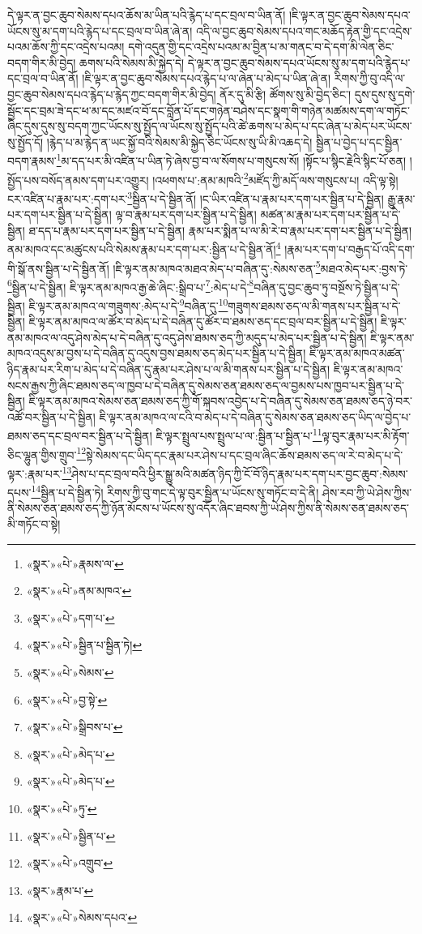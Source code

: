 དེ་ལྟར་ན་བྱང་ཆུབ་སེམས་དཔའ་ཆོས་མ་ཡིན་པའི་རྙེད་པ་དང་བྲལ་བ་ཡིན་ནོ། །ཇི་ལྟར་ན་བྱང་ཆུབ་སེམས་དཔའ་ཡོངས་སུ་མ་དག་པའི་རྙེད་པ་དང་བྲལ་བ་ཡིན་ཞེ་ན། འདི་ལ་བྱང་ཆུབ་སེམས་དཔའ་གང་མཆོད་རྟེན་གྱི་དང་འདྲེས་པའམ་ཆོས་ཀྱི་དང་འདྲེས་པའམ། དགེ་འདུན་གྱི་དང་འདྲེས་པའམ་མ་བྱིན་པ་མ་གནང་བ་དེ་དག་མི་ལེན་ཅིང་བདག་གིར་མི་བྱེད། ཆགས་པའི་སེམས་མི་སྐྱེད་དེ། དེ་ལྟར་ན་བྱང་ཆུབ་སེམས་དཔའ་ཡོངས་སུ་མ་དག་པའི་རྙེད་པ་དང་བྲལ་བ་ཡིན་ནོ། །ཇི་ལྟར་ན་བྱང་ཆུབ་སེམས་དཔའ་རྙེད་པ་ལ་ཞེན་པ་མེད་པ་ཡིན་ཞེ་ན། རིགས་ཀྱི་བུ་འདི་ལ་བྱང་ཆུབ་སེམས་དཔའ་རྙེད་པ་རྙེད་ཀྱང་བདག་གིར་མི་བྱེད། ནོར་དུ་མི་རྩི། ཚོགས་སུ་མི་བྱེད་ཅིང་། དུས་དུས་སུ་དགེ་སྦྱོང་དང་བྲམ་ཟེ་དང་ཕ་མ་དང་མཛའ་བོ་དང་བློན་པོ་དང་གཉེན་བཤེས་དང་སྣག་གི་གཉེན་མཚམས་དག་ལ་གཏོང་ཞིང་དུས་དུས་སུ་བདག་ཀྱང་ཡོངས་སུ་སྤྱོད་ལ་ཡོངས་སུ་སྤྱོད་པའི་ཚེ་ཆགས་པ་མེད་པ་དང་ཞེན་པ་མེད་པར་ཡོངས་སུ་སྤྱོད་དོ། །རྙེད་པ་མ་རྙེད་ན་ཡང་སྐྱོ་བའི་སེམས་མི་སྐྱེད་ཅིང་ཡོངས་སུ་ཡི་མི་འཆད་དེ། སྦྱིན་པ་བྱེད་པ་དང་སྦྱིན་བདག་རྣམས་\footnote{«སྣར་»«པེ་»རྣམས་ལ་}མ་དད་པར་མི་འཛིན་པ་ཡིན་ཏེ་ཞེས་བྱ་བ་ལ་སོགས་པ་གསུངས་སོ། །སྟོང་པ་སྙིང་རྗེའི་སྙིང་པོ་ཅན། །སྤྱོད་པས་བསོད་ནམས་དག་པར་འགྱུར། །འཕགས་པ་:ནམ་མཁའི་\footnote{«སྣར་»«པེ་»ནམ་མཁའ་}མཛོད་ཀྱི་མདོ་ལས་གསུངས་པ། འདི་ལྟ་སྟེ། ངར་འཛིན་པ་རྣམ་པར་:དག་པར་\footnote{«སྣར་»«པེ་»དག་པ་}སྦྱིན་པ་དེ་སྦྱིན་ནོ། །ང་ཡིར་འཛིན་པ་རྣམ་པར་དག་པར་སྦྱིན་པ་དེ་སྦྱིན། རྒྱུ་རྣམ་པར་དག་པར་སྦྱིན་པ་དེ་སྦྱིན། ལྟ་བ་རྣམ་པར་དག་པར་སྦྱིན་པ་དེ་སྦྱིན། མཚན་མ་རྣམ་པར་དག་པར་སྦྱིན་པ་དེ་སྦྱིན། ཐ་དད་པ་རྣམ་པར་དག་པར་སྦྱིན་པ་དེ་སྦྱིན། རྣམ་པར་སྨིན་པ་ལ་མི་རེ་བ་རྣམ་པར་དག་པར་སྦྱིན་པ་དེ་སྦྱིན། ནམ་མཁའ་དང་མཚུངས་པའི་སེམས་རྣམ་པར་དག་པར་:སྦྱིན་པ་དེ་སྦྱིན་ནོ།\footnote{«སྣར་»«པེ་»སྦྱིན་པ་སྦྱིན་ཏེ།} །རྣམ་པར་དག་པ་བརྒྱད་པོ་འདི་དག་གི་སྒོ་ནས་སྦྱིན་པ་དེ་སྦྱིན་ནོ། །ཇི་ལྟར་ནམ་མཁའ་མཐའ་མེད་པ་བཞིན་དུ་:སེམས་ཅན་\footnote{«སྣར་»«པེ་»སེམས་}མཐའ་མེད་པར་:བྱས་ཏེ་\footnote{«སྣར་»«པེ་»བྱ་སྟེ་}སྦྱིན་པ་དེ་སྦྱིན། ཇི་ལྟར་ནམ་མཁའ་རྒྱ་ཆེ་ཞིང་:སྒྲིབ་པ་\footnote{«སྣར་»«པེ་»སྒྲིབས་པ་}:མེད་པ་དེ་\footnote{«སྣར་»«པེ་»མེད་པ་}བཞིན་དུ་བྱང་ཆུབ་ཏུ་བསྔོས་ཏེ་སྦྱིན་པ་དེ་སྦྱིན། ཇི་ལྟར་ནམ་མཁའ་ལ་གཟུགས་:མེད་པ་དེ་\footnote{«སྣར་»«པེ་»མེད་པ་}བཞིན་དུ་\footnote{«སྣར་»«པེ་»ཏུ་}གཟུགས་ཐམས་ཅད་ལ་མི་གནས་པར་སྦྱིན་པ་དེ་སྦྱིན། ཇི་ལྟར་ནམ་མཁའ་ལ་ཚོར་བ་མེད་པ་དེ་བཞིན་དུ་ཚོར་བ་ཐམས་ཅད་དང་བྲལ་བར་སྦྱིན་པ་དེ་སྦྱིན། ཇི་ལྟར་ནམ་མཁའ་ལ་འདུ་ཤེས་མེད་པ་དེ་བཞིན་དུ་འདུ་ཤེས་ཐམས་ཅད་ཀྱི་མདུད་པ་མེད་པར་སྦྱིན་པ་དེ་སྦྱིན། ཇི་ལྟར་ནམ་མཁའ་འདུས་མ་བྱས་པ་དེ་བཞིན་དུ་འདུས་བྱས་ཐམས་ཅད་མེད་པར་སྦྱིན་པ་དེ་སྦྱིན། ཇི་ལྟར་ནམ་མཁའ་མཚན་ཉིད་རྣམ་པར་རིག་པ་མེད་པ་དེ་བཞིན་དུ་རྣམ་པར་ཤེས་པ་ལ་མི་གནས་པར་སྦྱིན་པ་དེ་སྦྱིན། ཇི་ལྟར་ནམ་མཁའ་སངས་རྒྱས་ཀྱི་ཞིང་ཐམས་ཅད་ལ་ཁྱབ་པ་དེ་བཞིན་དུ་སེམས་ཅན་ཐམས་ཅད་ལ་བྱམས་པས་ཁྱབ་པར་སྦྱིན་པ་དེ་སྦྱིན། ཇི་ལྟར་ནམ་མཁའ་སེམས་ཅན་ཐམས་ཅད་ཀྱི་གོ་སྐབས་འབྱེད་པ་དེ་བཞིན་དུ་སེམས་ཅན་ཐམས་ཅད་ཉེ་བར་འཚོ་བར་སྦྱིན་པ་དེ་སྦྱིན། ཇི་ལྟར་ནམ་མཁའ་ལ་ངའི་བ་མེད་པ་དེ་བཞིན་དུ་སེམས་ཅན་ཐམས་ཅད་ཡིད་ལ་བྱེད་པ་ཐམས་ཅད་དང་བྲལ་བར་སྦྱིན་པ་དེ་སྦྱིན། ཇི་ལྟར་སྤྲུལ་པས་སྤྲུལ་པ་ལ་:སྦྱིན་པ་སྦྱིན་པ་\footnote{«སྣར་»«པེ་»སྦྱིན་པ་}ལྟ་བུར་རྣམ་པར་མི་རྟོག་ཅིང་ལྷུན་གྱིས་གྲུབ་\footnote{«སྣར་»«པེ་»འགྲུབ་}སྟེ་སེམས་དང་ཡིད་དང་རྣམ་པར་ཤེས་པ་དང་བྲལ་ཞིང་ཆོས་ཐམས་ཅད་ལ་རེ་བ་མེད་པ་དེ་ལྟར་:རྣམ་པར་\footnote{«སྣར་»རྣམ་པ་}ཤེས་པ་དང་བྲལ་བའི་ཕྱིར་སྒྱུ་མའི་མཚན་ཉིད་ཀྱི་ངོ་བོ་ཉིད་རྣམ་པར་དག་པར་བྱང་ཆུབ་:སེམས་དཔས་\footnote{«སྣར་»«པེ་»སེམས་དཔའ་}སྦྱིན་པ་དེ་སྦྱིན་ཏེ། རིགས་ཀྱི་བུ་གང་དེ་ལྟ་བུར་སྦྱིན་པ་ཡོངས་སུ་གཏོང་བ་དེ་ནི། ཤེས་རབ་ཀྱི་ཡེ་ཤེས་ཀྱིས་ནི་སེམས་ཅན་ཐམས་ཅད་ཀྱི་ཉོན་མོངས་པ་ཡོངས་སུ་འདོར་ཞིང་ཐབས་ཀྱི་ཡེ་ཤེས་ཀྱིས་ནི་སེམས་ཅན་ཐམས་ཅད་མི་གཏོང་བ་སྟེ། 
